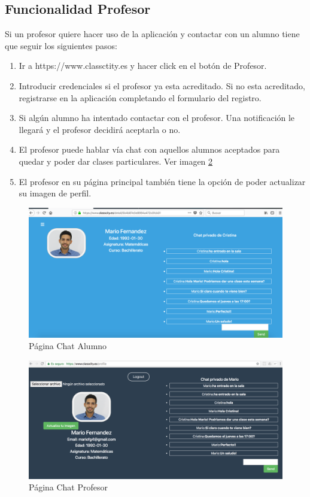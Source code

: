 \subsection{Funcionalidad Profesor}
Si un profesor quiere hacer uso de la aplicación y contactar con un alumno tiene que seguir los siguientes pasos:
\begin{enumerate}
\item Ir a https://www.classctity.es y hacer click en el botón de Profesor.
\item Introducir credenciales si el profesor ya esta acreditado. Si no esta acreditado, registrarse en la aplicación completando el formulario del registro.
\item Si algún alumno ha intentado contactar con el profesor. Una notificación le llegará y el profesor decidirá aceptarla o no.
\item El profesor puede hablar vía chat con aquellos alumnos aceptados para quedar y poder dar clases particulares. Ver imagen \ref{img:chatprofesor}
\item El profesor en su página principal también tiene la opción de poder actualizar su imagen de perfil.
\end{enumerate}
\begin{figure}[h]
    \centering
    \includegraphics[width=150mm]{img/templates/chatalumno.png}
    \caption{Página Chat Alumno}
    \label{img:chatalumno}
\end{figure}
\begin{figure}[h]
    \centering
    \includegraphics[width=150mm]{img/templates/chatprofesor.png}
    \caption{Página Chat Profesor}
    \label{img:chatprofesor}
\end{figure}
